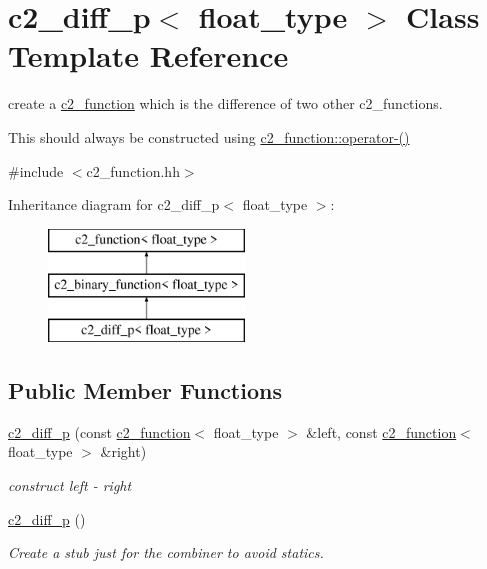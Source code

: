\hypertarget{classc2__diff__p}{\section{c2\-\_\-diff\-\_\-p$<$ float\-\_\-type $>$ Class Template Reference}
\label{classc2__diff__p}
}


create a \hyperlink{classc2__function}{c2\-\_\-function} which is the difference of two other c2\-\_\-functions.

This should always be constructed using \hyperlink{classc2__function_a4c56a4673e00bfad37143c403a0c94c8}{c2\-\_\-function\-::operator-\/()}  




{\ttfamily \#include $<$c2\-\_\-function.\-hh$>$}

Inheritance diagram for c2\-\_\-diff\-\_\-p$<$ float\-\_\-type $>$\-:\begin{figure}[H]
\begin{center}
\leavevmode
\includegraphics[height=3.000000cm]{classc2__diff__p}
\end{center}
\end{figure}
\subsection*{Public Member Functions}
\begin{DoxyCompactItemize}
\item 
\hyperlink{classc2__diff__p_adcfb42900f8d8712e055171056688818}{c2\-\_\-diff\-\_\-p} (const \hyperlink{classc2__function}{c2\-\_\-function}$<$ float\-\_\-type $>$ \&left, const \hyperlink{classc2__function}{c2\-\_\-function}$<$ float\-\_\-type $>$ \&right)
\begin{DoxyCompactList}\small\item\em construct {\itshape left} -\/ {\itshape right} \end{DoxyCompactList}\item 
\hypertarget{classc2__diff__p_a8e3593f3c2bcdceb79f57461e099db08}{\hyperlink{classc2__diff__p_a8e3593f3c2bcdceb79f57461e099db08}{c2\-\_\-diff\-\_\-p} ()}\label{classc2__diff__p_a8e3593f3c2bcdceb79f57461e099db08}

\begin{DoxyCompactList}\small\item\em Create a stub just for the combiner to avoid statics. \end{DoxyCompactList}\end{DoxyCompactItemize}
